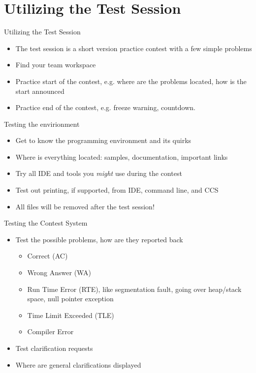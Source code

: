 \documentclass[11pt,pdf, aspectratio=169]{beamer}
\begin{document}
  \section{Utilizing the Test Session}
  \begin{frame}{Utilizing the Test Session}
    \begin{itemize}
      \item The test session is a short version practice contest with a few simple problems
      \item Find your team workspace
      \item Practice start of the contest, e.g. where are the problems located, how is the start announced
      \item Practice end of the contest, e.g. freeze warning, countdown.
    \end{itemize}
  \end{frame}
  \begin{frame}{Testing the envirionment}
    \begin{itemize}
      \item<1-> Get to know the programming environment and its quirks
      \item <2-> Where is everything located: samples, documentation, important links
      \item <3-> Try all IDE and tools you \textit{might} use during the contest
      \item <4-> Test out printing, if supported, from IDE, command line, and CCS
      \item <5-> All files will be removed after the test session!
    \end{itemize}
  \end{frame}
  \begin{frame}{Testing the Contest System}
    \begin{itemize}
      \item Test the possible problems, how are they reported back
      \begin{itemize}
        \item Correct (AC)
        \item Wrong Answer (WA)
        \item Run Time Error (RTE), like segmentation fault, going over heap/stack space, null pointer exception
        \item Time Limit Exceeded (TLE)
        \item Compiler Error
      \end{itemize}
      \item Test clarification requests
      \item Where are general clarifications displayed
    \end{itemize}
  \end{frame}
\end{document}
